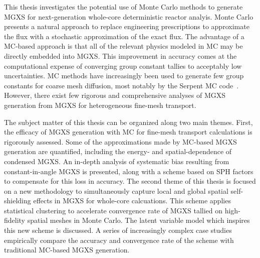 This thesis investigates the potential use of Monte Carlo methods to generate \ac{MGXS} for next-generation whole-core deterministic reactor analyis. Monte Carlo presents a natural approach to replace engineering prescriptions to approximate the flux with a stochastic approximation of the exact flux. The advantage of a \ac{MC}-based approach is that all of the relevant physics modeled in \ac{MC} may be directly embedded into \ac{MGXS}. This improvement in accuracy comes at the computational expense of converging group constant tallies to acceptably low uncertainties. \ac{MC} methods have increasingly been used to generate few group constants for coarse mesh diffusion, most notably by the Serpent \ac{MC} code~\cite{serpent2013manual}. However, there exist few rigorous and comprehensive analyses of \ac{MGXS} generation from \ac{MGXS} for heterogeneous fine-mesh transport.

The subject matter of this thesis can be organized along two main themes. First, the efficacy of \ac{MGXS} generation with \ac{MC} for fine-mesh transport calculations is rigorously assessed. Some of the approximations made by \ac{MC}-based \ac{MGXS} generation are quantified, including the energy- and spatial-dependence of condensed \ac{MGXS}. An in-depth analysis of systematic bias resulting from constant-in-angle \ac{MGXS} is presented, along with a scheme based on \ac{SPH} factors to compensate for this loss in accuracy. The second theme of this thesis is focused on a new methodology to simultaneously capture local and global spatial self-shielding effects in \ac{MGXS} for whole-core calcuations. This scheme applies statistical clustering to accelerate convergence rate of \ac{MGXS} tallied on high-fidelity spatial meshes in Monte Carlo. The latent variable model which inspires this new scheme is discussed. A series of increasingly complex case studies empirically compare the accuracy and convergence rate of the scheme with traditional \ac{MC}-based MGXS generation.


